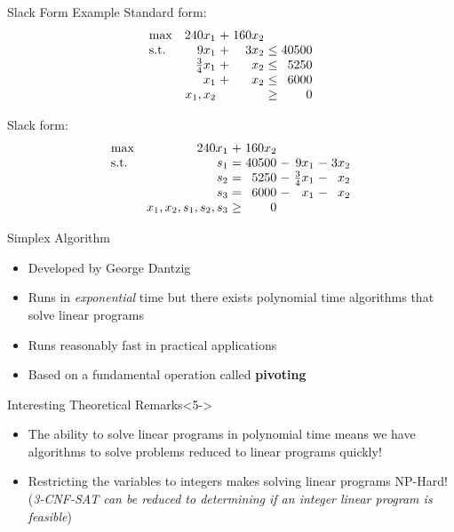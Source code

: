 \documentclass{beamer}
\begin{document}
\begin{frame}{Slack Form Example}
    Standard form:
    \begin{equation*}
    \setlength\arraycolsep{1.5pt}
      \begin{array}{l@{\quad} r c r c r}
        \max          & 240x_1 & + &         160x_2 &      &    \\
        \mathrm{s.t.} &   9x_1 & + &           3x_2 & \leq & 40500 \\
                      &    \frac{3}{4}x_1 & + &           x_2 & \leq &  5250 \\
                      & x_1 & + & x_2 & \leq & 6000 \\
                      &    x_1, x_2 &  & & \geq &  0 \\
      \end{array}
    \end{equation*}
    
    \pause
    
    Slack form:
    \begin{equation*}
    \setlength\arraycolsep{1.5pt}
      \begin{array}{l@{\quad} r c r c r c r}
        \max          & 240x_1 & + &         160x_2 &      &    \\
        \mathrm{s.t.} & s_1 & = & 40500 & - & 9x_1 & - & 3x_2 \\
        & s_2 & = & 5250 & - & \frac{3}{4}x_1 & - & x_2 \\
        & s_3 & = & 6000 & - & x_1 & - & x_2 \\
        & x_1, x_2, s_1, s_2, s_3 & \geq & 0 &&&&  \\
      \end{array}
    \end{equation*}
\end{frame}

\begin{frame}{Simplex Algorithm}
    \begin{itemize}
        \item<1-> Developed by George Dantzig
        \item<2-> Runs in \textit{exponential} time but there exists polynomial time algorithms that solve linear programs
        \item<3-> Runs reasonably fast in practical applications
        \item<4-> Based on a fundamental operation called \textbf{pivoting}
    \end{itemize}
    \begin{block}{Interesting Theoretical Remarks}<5->
        \begin{itemize}
            \item<5-> The ability to solve linear programs in polynomial time means we have algorithms to solve problems reduced to linear programs quickly!
            \item<6-> Restricting the variables to integers makes solving linear programs \alert{NP-Hard}! (\textit{3-CNF-SAT can be reduced to determining if an integer linear program is feasible})
        \end{itemize}
    \end{block}
\end{frame}
\end{document}
